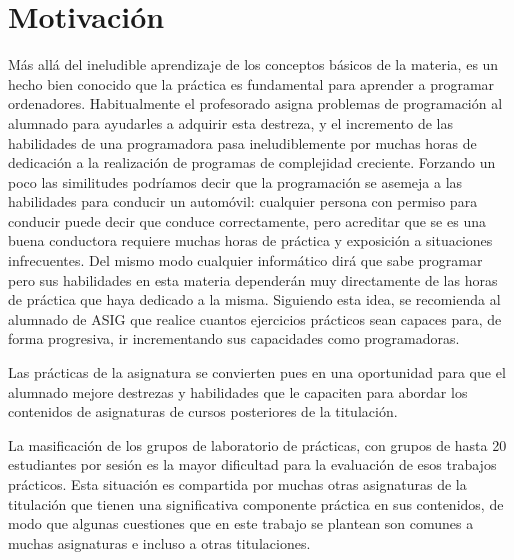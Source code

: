 \documentclass[twocolumn,twoside,a4paper, 10pt]{article}
\begin{document}
\section{Motivación}
Más allá del ineludible aprendizaje de los conceptos básicos de la materia, 
es un hecho bien conocido que la práctica es fundamental para aprender a programar ordenadores. 
Habitualmente el profesorado asigna problemas de programación al alumnado para ayudarles a adquirir esta 
destreza, y el incremento de las habilidades de una programadora pasa ineludiblemente por muchas horas de dedicación 
a la realización de programas de complejidad creciente.
Forzando un poco las similitudes podríamos decir que la programación se asemeja a las habilidades para
conducir un automóvil: cualquier persona con permiso para conducir puede decir que conduce correctamente, pero
acreditar que se es una buena conductora requiere muchas horas de práctica y exposición a situaciones
infrecuentes.
Del mismo modo cualquier informático dirá que sabe programar pero sus habilidades en esta materia dependerán
muy directamente de las horas de práctica que haya dedicado a la misma.
Siguiendo esta idea, se recomienda al alumnado de ASIG que realice cuantos ejercicios prácticos
sean capaces para, de forma progresiva, ir incrementando sus capacidades como programadoras.

Las prácticas de la asignatura se convierten pues en una oportunidad para que el alumnado mejore destrezas y
habilidades que le capaciten para abordar los contenidos de asignaturas de cursos posteriores de la
titulación.

La masificación de los grupos de laboratorio de prácticas, con grupos de hasta 20 estudiantes por sesión es
la mayor dificultad para la evaluación de esos trabajos prácticos.
Esta situación es compartida por muchas otras asignaturas de la titulación que tienen una significativa
componente práctica en sus contenidos, de modo que algunas cuestiones que en este trabajo se plantean
son comunes a muchas asignaturas e incluso a otras titulaciones.
\end{document}
